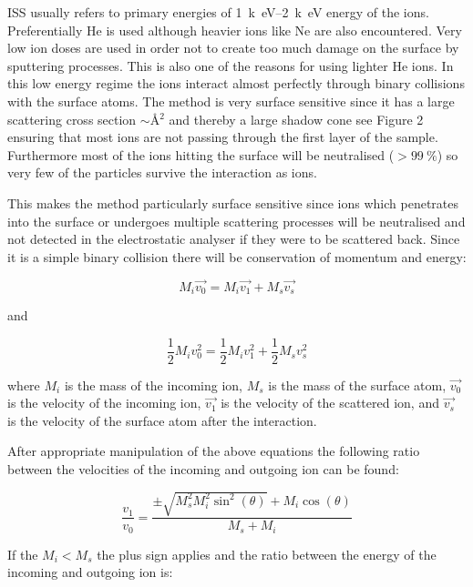 \vspace{1cm}

ISS usually refers to primary energies of \SIrange{1}{2}{k\electronvolt} energy of the ions. Preferentially He is used although heavier ions like Ne are also encountered. Very low ion doses are used in order not to create too much damage on the surface by sputtering processes. This is also one of the reasons for using lighter He ions. In this low  energy regime the ions interact almost perfectly through binary collisions with the surface atoms. The method is very surface sensitive since it has a large scattering cross section $\sim \si{\angstrom^2}$ and thereby a large shadow cone see Figure 2 ensuring that most ions are not passing through the first layer of the sample. Furthermore most of the ions hitting the surface will be neutralised ($>\SI{99}{\percent}$) so very few of the particles survive the interaction as ions.

This makes the method particularly surface sensitive since ions which penetrates into the surface or undergoes multiple scattering processes will be neutralised and not detected in the electrostatic analyser if they were to be scattered back. Since it is a simple binary collision there will be conservation of momentum and energy:

\begin{equation}
M_i\vec{v_0}=M_i\vec{v_1}+M_s\vec{v_s}
\end{equation}

\noindent and
 
\begin{equation}
\frac{1}{2}M_iv_0^2=\frac{1}{2}M_iv_1^2+\frac{1}{2}M_sv_s^2
\end{equation}

\noindent where $M_i$ is the mass of the incoming ion, $M_s$ is the mass of the surface atom, $\vec{v_0}$ is the velocity of the incoming ion, $\vec{v_1}$ is the velocity of the scattered ion, and $\vec{v_s}$ is the velocity of the surface atom after the interaction.

After appropriate manipulation of the above equations the following ratio between the velocities of the incoming and outgoing ion can be found:

\begin{equation}
\frac{v_1}{v_0}=\frac{\pm\sqrt{M_s^2M_i^2\sin^2(\theta)}+M_i\cos(\theta)}{M_s+M_i}
\end{equation}

If the $M_i<M_s$ the plus sign applies and the ratio between the energy of the incoming and outgoing ion is:

